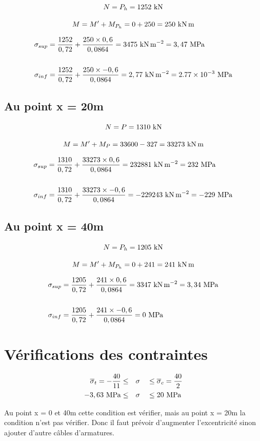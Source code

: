 \documentclass[12pt,a4paper]{article}
\newcommand{\sgma}[1]{\sigma_{#1}}
\newcommand{\sigmabar}[1]{\overline{\sigma}_{#1}}
\begin{document}
	\[ N = P_{h} = 1252\kn \]
	
	\[ M = M' + M_{P_{h}} = 0 + 250 = 250\knxm \]
	
	\[ \begin{aligned}
		\sgma{sup} &= \dfrac{1252}{0,72} + \dfrac{250 \times 0,6}{0,0864} = 3475\knms = 3,47\mpa \\ \\
		\sgma{inf} &= \dfrac{1252}{0,72} + \dfrac{250 \times -0,6}{0,0864} = 2,77\knms = \num{2,77e-3}\mpa
	\end{aligned} \]	
	
	
	\subsection{Au point x = 20m}
	
	\[ N = P = 1310\kn \]
	
	\[ M = M' + M_{P} = 33600 - 327 = 33273\knxm \]
	
	\[ \begin{aligned}
		\sgma{sup} &= \dfrac{1310}{0,72} + \dfrac{33273 \times 0,6}{0,0864} = 232881\knms = 232\mpa \\ \\
		\sgma{inf} &= \dfrac{1310}{0,72} + \dfrac{33273 \times -0,6}{0,0864} = -229243\knms = -229\mpa
	\end{aligned} \]
	
	
	\subsection{Au point x = 40m}
	
	\[ N = P_{h} = 1205\kn \]
	
	\[ M = M' + M_{P_{h}} = 0 + 241 = 241\knxm \]
	
	\[ \begin{aligned}
		\sgma{sup} &= \dfrac{1205}{0,72} + \dfrac{241 \times 0,6}{0,0864} = 3347\knms = 3,34\mpa \\ \\
		\sgma{inf} &= \dfrac{1205}{0,72} + \dfrac{241 \times -0,6}{0,0864} = 0\mpa
	\end{aligned} \]
	
	
	
	\section{Vérifications des contraintes}
	
	\[ \begin{aligned}
		\sigmabar{t} = -\dfrac{40}{11} \leq\quad &\sigma \quad\leq \sigmabar{c} = \dfrac{40}{2} \\
		 - 3,63\mpa \leq\quad &\sigma \quad\leq 20\mpa
	\end{aligned} \]
	
	Au point x = 0 et 40m cette condition est vérifier, mais au point x = 20m la condition n'est pas vérifier. Donc il faut prévoir d'augmenter l'excentricité sinon ajouter d'autre câbles d'armatures.
	
	
	
	
	
	
	
	
	
	
	
	
\end{document}
